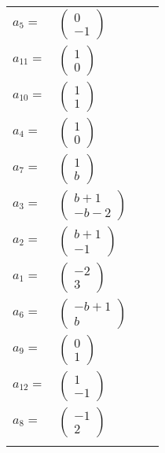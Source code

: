 \documentclass[1p]{elsarticle_modified}
\theoremstyle{definition}
\begin{document}
\begin{tabular}{m{7pt} m{180pt} m{7pt} m{180pt} }
\flushright $a_{5}=$&$\begin{pmatrix}0\\-1\end{pmatrix}$ \\
\flushright $a_{11}=$&$\begin{pmatrix}1\\0\end{pmatrix}$ \\
\flushright $a_{10}=$&$\begin{pmatrix}1\\1\end{pmatrix}$ \\
\flushright $a_{4}=$&$\begin{pmatrix}1\\0\end{pmatrix}$ \\
\flushright $a_{7}=$&$\begin{pmatrix}1\\b\end{pmatrix}$ \\
\flushright $a_{3}=$&$\begin{pmatrix}b+1\\- b-2\end{pmatrix}$ \\
\flushright $a_{2}=$&$\begin{pmatrix}b+1\\-1\end{pmatrix}$ \\
\flushright $a_{1}=$&$\begin{pmatrix}-2\\3\end{pmatrix}$ \\
\flushright $a_{6}=$&$\begin{pmatrix}- b+1\\b\end{pmatrix}$ \\
\flushright $a_{9}=$&$\begin{pmatrix}0\\1\end{pmatrix}$ \\
\flushright $a_{12}=$&$\begin{pmatrix}1\\-1\end{pmatrix}$ \\
\flushright $a_{8}=$&$\begin{pmatrix}-1\\2\end{pmatrix}$\\&\end{tabular}
\end{document}
